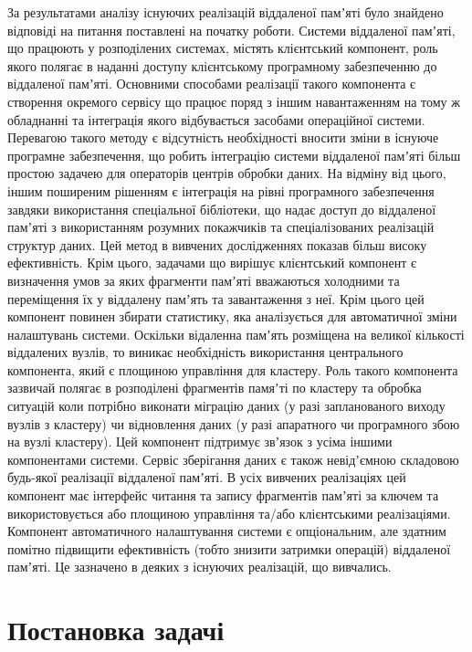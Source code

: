 \documentclass[14pt]{article}
\begin{document}
За результатами аналізу існуючих реалізацій віддаленої памʼяті було знайдено відповіді на питання поставлені на початку роботи.
	Системи віддаленої памʼяті, що працюють у розподілених системах, містять клієнтський компонент, роль якого полягає в наданні доступу клієнтському програмному забезпеченню до віддаленої памʼяті. Основними способами реалізації такого компонента є створення окремого сервісу що працює поряд з іншим навантаженням на тому ж обладнанні та інтеграція якого відбувається засобами операційної системи. Перевагою такого методу є відсутність необхідності вносити зміни в існуюче програмне забезпечення, що робить інтеграцію системи віддаленої памʼяті більш простою задачею для операторів центрів обробки даних. На відміну від цього, іншим поширеним рішенням є інтеграція на рівні програмного забезпечення завдяки використання спеціальної бібліотеки, що надає доступ до віддаленої памʼяті з використанням розумних покажчиків та спеціалізованих реалізацій структур даних. Цей метод в вивчених дослідженнях показав більш високу ефективність. Крім цього, задачами що вирішує клієнтський компонент є визначення умов за яких фрагменти памʼяті вважаються холодними та переміщення їх у віддалену памʼять та завантаження з неї. Крім цього цей компонент повинен збирати статистику, яка аналізується для автоматичної зміни налаштувань системи.
	Оскільки відаленна памʼять розміщена на великої кількості віддалених вузлів, то виникає необхідність використання центрального компонента, який є площиною управління для кластеру. Роль такого компонента зазвичай полягає в розподілені фрагментів памяʼті по кластеру та обробка ситуацій коли потрібно виконати міграцію даних (у разі запланованого виходу вузлів з кластеру) чи відновлення даних (у разі апаратного чи програмного збою на вузлі кластеру). Цей компонент підтримує звʼязок з усіма іншими компонентами системи.
	Сервіс зберігання даних є також невідʼємною складовою будь-якої реалізації віддаленої памʼяті. В усіх вивчених реалізаціях цей компонент має інтерфейс читання та запису фрагментів памʼяті за ключем та використовується або площиною управління та/або клієнтськими реалізаціями.
	Компонент автоматичного налаштування системи є опціональним, але здатним помітно підвищити ефективність (тобто знизити затримки операцій) віддаленої памʼяті. Це зазначено в деяких з існуючих реалізацій, що вивчались.

\section{Постановка задачі}
\end{document}
